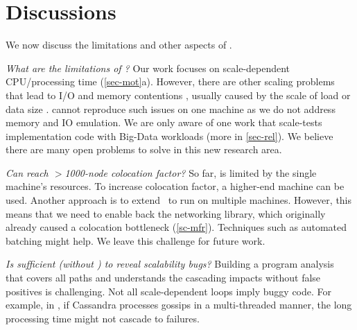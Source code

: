 

\section{Discussions}
\label{sec-discuss}

We now discuss the limitations and other aspects of \sck.


{\em What are the limitations of \sck?}
%
Our work focuses on scale-dependent CPU/processing time
(\sec\ref{sec-mot}a).
%
However, there are other scaling problems that lead to I/O and memory
contentions \cite{ Gunawi+14-Cbs, Ousterhout+15-MakingSense,
  Konstantin+10-HDFSScalability}, usually caused by the scale of load
\cite{Bodik+10-WorkloadSpikes, Guo+13-CureIsWorse} or data size
\cite{Nguyen+16-Yak}.
\sck cannot reproduce such issues on one machine as we do not address
memory and IO emulation.
%
We are only aware of one work \cite{Wang+14-Exalt} that scale-tests
implementation code with Big-Data workloads (more in
\sec\ref{sec-rel}).
%
We believe there are many open problems to solve in this new research
area.


{\em Can \sck reach $>$1000-node colocation factor?}  So far, \sck is
limited by the single machine's resources.  To increase colocation factor,
a higher-end machine can be used.   Another approach is to 
extend \sck\ to run on multiple machines.
However, this means that we need to enable back the networking library,
which originally already caused a colocation 
bottleneck (\sec\ref{sc-mfr}).  Techniques such as automated
batching might help.  We leave this challenge for future work.



{\em Is \sfind sufficient (without \stest) to reveal scalability bugs?}
Building a program analysis that covers all paths and understands the
cascading impacts without false positives is challenging.  Not all
scale-dependent loops imply buggy code.  For example, in \caone, if
Cassandra processes gossips in a multi-threaded manner, the long
processing time might not cascade to failures.



